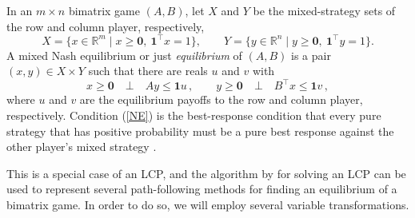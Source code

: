 \documentclass[a4paper,12pt]{article}  %
\theoremstyle{definition}
\def\reals{{\mathbb R}}
\newcommand{\T}{^{\top}}
\newcommand{\0}{{\mathbf0}}
\newcommand{\1}{{\mathbf1}}
\begin{document}
In an $m\times n$ bimatrix game $(A,B)$, let 
$X$ and $Y$ be the mixed-strategy sets of the row and column
player, respectively,
\begin{equation}
\label{XY}
X=\{x\in\reals^m\mid x\ge\0,~\1\T x=1\},
\qquad
Y=\{y\in\reals^n\mid y\ge\0,~\1\T y=1\}. 
\end{equation}
A mixed Nash equilibrium or just \textit{equilibrium} of
$(A,B)$ is a pair $(x,y)\in X\times Y$ such that there are
reals $u$ and $v$ with
\begin{equation}
\label{NE}
x\ge\0
\quad\bot\quad 
Ay\le\1 u\,,\qquad
y\ge\0
\quad\bot\quad 
B\T x\le\1 v\,,
\end{equation}
where $u$ and $v$ are the equilibrium payoffs to the row and
column player, respectively.
Condition (\ref{NE}) is the best-response condition that
every pure strategy that has positive probability must be a
pure best response against the other player's mixed
strategy \citep[proposition 6.1]{vS22}.

This is a special case of an LCP, and the algorithm 
by \citet{Lemke1965} for solving an LCP can be used to
represent several path-following methods for finding an
equilibrium of a bimatrix game.
In order to do so, we will employ several variable
transformations.
\end{document}
